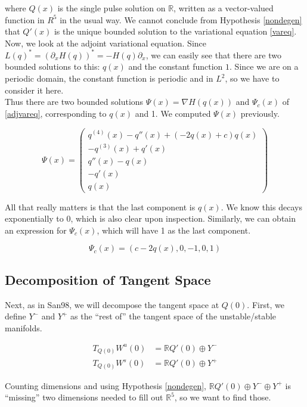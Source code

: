 \documentclass[12pt]{article}
\def\R{{\mathbb R}}
\begin{document}
where $Q(x)$ is the single pulse solution on $\R$, written as a vector-valued function in $R^5$ in the usual way. We cannot conclude from Hypothesis \ref{nondegen} that $Q'(x)$ is the unique bounded solution to the variational equation \eqref{vareq}.\\

Now, we look at the adjoint variational equation. Since $L(q)^* = (\partial_x H(q))^* = -H(q) \partial_x$, we can easily see that there are two bounded solutions to this: $q(x)$ and the constant function $1$. Since we are on a periodic domain, the constant function is periodic and in $L^2$, so we have to consider it here.\\

Thus there are two bounded solutions $\Psi(x) = \nabla H(q(x))$ and $\Psi_c(x)$ of \eqref{adjvareq}, corresponding to $q(x)$ and 1. We computed $\Psi(x)$ previously.

\[
\Psi(x) = \begin{pmatrix}
q^{(4)}(x) - q''(x) + (-2q(x) + c)q(x)\\
-q^{(3)}(x) + q'(x) \\
q''(x) - q(x) \\
-q'(x) \\
q(x)
\end{pmatrix}
\]

All that really matters is that the last component is $q(x)$. We know this decays exponentially to 0, which is also clear upon inspection. Similarly, we can obtain an expression for $\Psi_c(x)$, which will have 1 as the last component.

\[
\Psi_c(x) = (c - 2 q(x), 0, -1, 0, 1)
\]

\subsection{Decomposition of Tangent Space}

Next, as in San98, we will decompose the tangent space at $Q(0)$. First, we define $Y^-$ and $Y^+$ as the ``rest of'' the tangent space of the unstable/stable manifolds.

\begin{align*}
T_{Q(0)} W^u(0) &= \R Q'(0) \oplus Y^- \\
T_{Q(0)} W^s(0) &= \R Q'(0) \oplus Y^+
\end{align*}

Counting dimensions and using Hypothesis \ref{nondegen}, $\R Q'(0) \oplus Y^- \oplus Y^+$ is ``missing'' two dimensions needed to fill out $\R^5$, so we want to find those.\\
\end{document}
